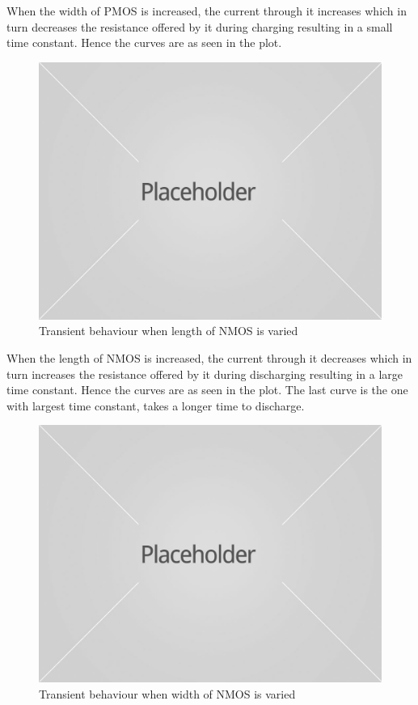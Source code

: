 \documentclass[12pt,a4paper]{article}
\begin{document}
When the width of PMOS is increased, the current through it increases which in turn decreases the resistance offered by it during charging resulting in a small time constant. Hence the curves are as seen in the plot.

\begin{figure}[H]
\begin{center}
\includegraphics[scale=0.20]{placeholder.jpg}
\caption{Transient behaviour when length of NMOS is varied}
\end{center}
\end{figure}

When the length of NMOS is increased, the current through it decreases which in turn increases the resistance offered by it during discharging resulting in a large time constant. Hence the curves are as seen in the plot. The last curve is the one with largest time constant, takes a longer time to discharge.


\begin{figure}[H]
\begin{center}
\includegraphics[scale=0.20]{placeholder.jpg}
\caption{Transient behaviour when width of NMOS is varied}
\end{center}
\end{figure}
\end{document}
